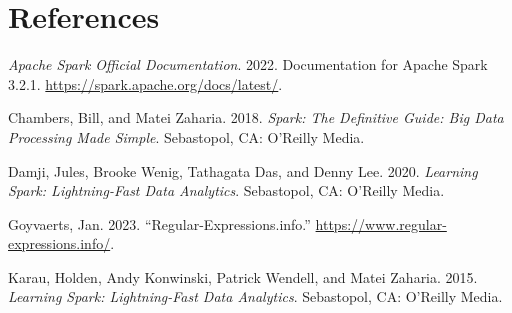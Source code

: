 \documentclass[
  11pt,
  letterpaper,
  DIV=11,
  numbers=noendperiod]{scrreprt}
\newlength{\cslhangindent}
\newenvironment{CSLReferences}[2] %
 {\begin{list}{}{%
  \setlength{\itemindent}{0pt}
  \setlength{\leftmargin}{0pt}
  \setlength{\parsep}{0pt}
  \ifodd #1
   \setlength{\leftmargin}{\cslhangindent}
   \setlength{\itemindent}{-1\cslhangindent}
  \fi
  \setlength{\itemsep}{#2\baselineskip}}}
 {\end{list}}
\begin{document}
\chapter*{References}\label{references}


\label{refs}
\begin{CSLReferences}{1}{0}
\emph{Apache Spark Official Documentation}. 2022. Documentation for
Apache Spark 3.2.1. \url{https://spark.apache.org/docs/latest/}.

Chambers, Bill, and Matei Zaharia. 2018. \emph{Spark: The Definitive
Guide: Big Data Processing Made Simple}. Sebastopol, CA: O'Reilly Media.

Damji, Jules, Brooke Wenig, Tathagata Das, and Denny Lee. 2020.
\emph{Learning Spark: Lightning-Fast Data Analytics}. Sebastopol, CA:
O'Reilly Media.

Goyvaerts, Jan. 2023. {``Regular-Expressions.info.''}
\url{https://www.regular-expressions.info/}.

Karau, Holden, Andy Konwinski, Patrick Wendell, and Matei Zaharia. 2015.
\emph{Learning Spark: Lightning-Fast Data Analytics}. Sebastopol, CA:
O'Reilly Media.

\end{CSLReferences}
\end{document}
